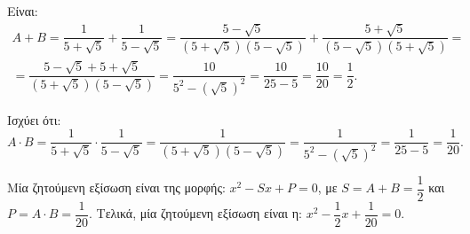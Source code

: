 
\begin{alist}
\item 
\begin{rlist}
\item Είναι:
\begin{gather*}
A + B = \dfrac{1}{5 + \sqrt{5}} + \dfrac{1}{5 - \sqrt{5}} = \dfrac{5 - \sqrt{5}}{(5 + \sqrt{5})(5 - \sqrt{5})} + \dfrac{5 + \sqrt{5}}{(5 - \sqrt{5})(5 + \sqrt{5})} = \\
= \dfrac{5 - \sqrt{5} + 5 + \sqrt{5}}{(5 + \sqrt{5})(5 - \sqrt{5})} = \dfrac{10}{5^2 - (\sqrt{5})^2} = \dfrac{10}{25 - 5} = \dfrac{10}{20} = \dfrac{1}{2}.
\end{gather*}

\item Ισχύει ότι:
\[A \cdot B = \dfrac{1}{5 + \sqrt{5}} \cdot \dfrac{1}{5 - \sqrt{5}} = \dfrac{1}{(5 + \sqrt{5})(5 - \sqrt{5})} = \dfrac{1}{5^2 - (\sqrt{5})^2} = \dfrac{1}{25 - 5} = \dfrac{1}{20}.\]
\end{rlist}

\item Μία ζητούμενη εξίσωση είναι της μορφής: $x^2 - Sx + P = 0$, με
$S = A + B = \dfrac{1}{2}$ και $P = A \cdot B = \dfrac{1}{20}$.
Τελικά, μία ζητούμενη εξίσωση είναι η:
$x^2 - \dfrac{1}{2}x + \dfrac{1}{20} = 0$.
\end{alist}

